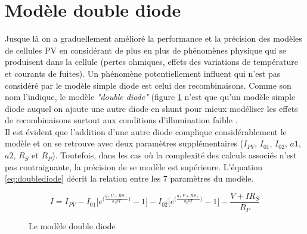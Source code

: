 \section{Modèle double diode}

Jusque là on a graduellement amélioré la performance et la précision des modèles de cellules PV en considérant de plus en plus de phénomènes physique qui se produisent dans la cellule (pertes ohmiques, effets des variations de température et courants de fuites). Un phénomène potentiellement influent qui n'est pas considéré par le modèle simple diode est celui des recombinaisons. Comme son nom l'indique, le modèle \textit{"double diode"} (figure \ref{fig:doublediode} n'est que qu'un modèle simple diode auquel on ajoute une autre diode en shunt pour mieux modéliser les effets de recombinaisons surtout aux conditions d'illumination faible \cite{Chin2015b}.\\
Il est évident que l'addition d'une autre diode complique considérablement le modèle et on se retrouve avec deux paramètres supplémentaires ($I_{PV}$, $I_{01}$, $I_{02}$, $a1$, $a2$, $R_S$ et $R_P$). Toutefois, dans les cas où la complexité des calculs associés n'est pas contraignante, la précision de se modèle est supérieure. L'équation \ref{eq:doublediode} décrit la relation entre les 7 paramètres du modèle.

\begin{equation}
  \label{eq:doublediode}
  I = I_{PV} - I_{01} \bigg[e^{\big(\frac{q(V + RS)}{a_1kT}\big)} - 1\bigg] - I_{02} \bigg[e^{\big(\frac{q(V + RS)}{a_2kT}\big)} - 1\bigg] - \frac{V + I R_S}{R_P}
\end{equation}

\begin{figure}[b]
  \begin{center}
    \shorthandoff{:!}
    \shorthandon{:!}
    \caption{Le modèle double diode}
    \label{fig:doublediode}
  \end{center}
\end{figure}

